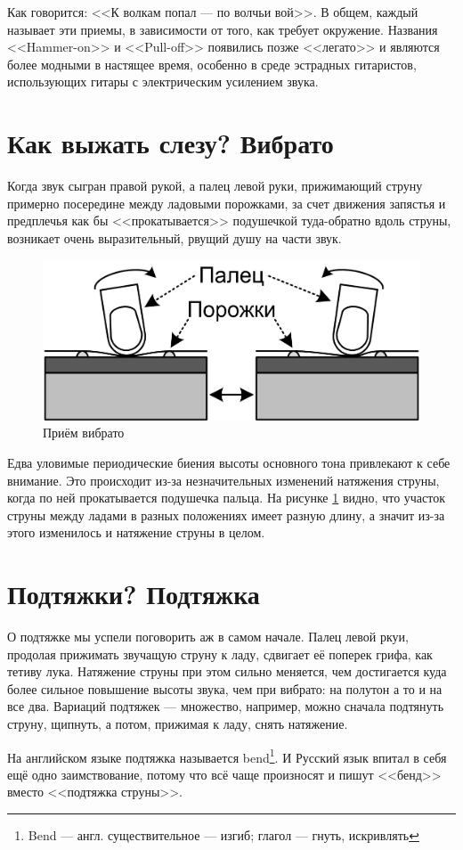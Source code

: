 Как говорится: <<К волкам попал --- по волчьи вой>>. В общем, каждый называет эти приемы, в зависимости от того, как требует окружение. Названия <<Hammer-on>> и <<Pull-off>> появились позже <<легато>> и являются более модными в настящее время, особенно в среде эстрадных гитаристов, использующих гитары с электрическим усилением звука.


\section{Как выжать слезу? Вибрато}
\label{ch:tricks:vibrato}

Когда звук сыгран правой рукой, а палец левой руки, прижимающий струну примерно посередине между ладовыми порожками, за счет движения запястья и предплечья как бы <<прокатывается>> подушечкой туда-обратно вдоль струны, возникает очень выразительный, рвущий душу на части звук.  

\begin{figure}[!ht]
    \centering
    \includegraphics{fig/vibrato} 
    \caption{Приём вибрато}\label{fig:tricks:vibrato}
\end{figure}

Едва уловимые периодические биения высоты основного тона привлекают к себе внимание. Это происходит из-за незначительных изменений натяжения струны, когда по ней прокатывается подушечка пальца. На рисунке \ref{fig:tricks:vibrato} видно, что участок струны между ладами в разных положениях имеет разную длину, а значит из-за этого изменилось и натяжение струны в целом.


\section{Подтяжки? Подтяжка}

О подтяжке мы успели поговорить аж в самом начале. Палец левой ркуи, продолая прижимать звучащую струну к ладу, сдвигает её поперек грифа, как тетиву лука. Натяжение струны при этом сильно меняется, чем достигается куда более сильное повышение высоты звука, чем при вибрато: на полутон а то и на все два. Вариаций подтяжек --- множество, например, можно сначала подтянуть струну, щипнуть, а потом, прижимая к ладу, снять натяжение. 

На английском языке подтяжка называется bend\footnote{Bend --- англ. существительное --- изгиб; глагол --- гнуть, искривлять}. И Русский язык впитал в себя ещё одно заимствование, потому что всё чаще произносят и пишут <<бенд>> вместо <<подтяжка струны>>.
